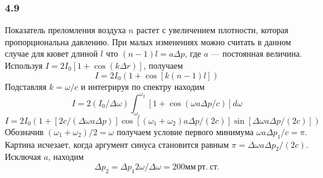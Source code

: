 \subsubsection*{4.9}
Показатель преломления воздуха $n$ растет с увеличением плотности, которая пропорциональна давлению. При малых изменениях можно считать в данном случае для кювет длиной $l$ что $(n-1)l = a \Delta p$, где $a$ --- постоянная величина. Используя  $I = 2I_0\left[ 1 + \cos (k \Delta r)\right] $, получаем
\begin{equation*}
	 I = 2I_0( 1 + \cos  \left[ k (n-1)l\right] )
\end{equation*}
Подставляя $k = \omega / c$ и интегрируя по спектру находим 
\begin{equation*}
	I = 2(I_0/\Delta \omega) \int_{\omega_1}^{\omega_2} \left[ 1 + \cos (\omega a \Delta  p / c) \right] d\omega 	
\end{equation*}
\begin{equation*}
	I = 2I_0\left( 1 + \left[2c/(\Delta \omega a \Delta p)\right]\cos \left[(\omega_1 + \omega_2) a \Delta p /(2c)\right] \sin \left[\Delta \omega a \Delta p / (2c)\right] \right)
\end{equation*}
Обозначив $(\omega_1 + \omega_2)/2 = \omega$ получаем условие первого минимума $\omega a \Delta p_1 /c =\pi$. Картина исчезает, когда аргумент синуса становится равным $\pi = \Delta \omega a \Delta p_2 / (2c)$. Исключая $a$, находим 
\begin{equation*}
	\Delta p_2 = \Delta p_1 2 \omega/ \Delta \omega = 200 мм \ рт. \ ст.
\end{equation*}
